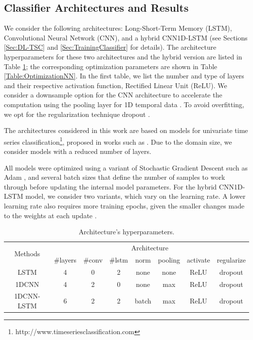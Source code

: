 \subsection{Classifier Architectures and Results}
\label{Sec:TSC_NN_Results}

We consider the following architectures: Long-Short-Term Memory (LSTM), Convolutional Neural Network (CNN), and a hybrid CNN1D-LSTM (see Sections \ref{Sec:DL-TSC} and \ref{Sec:TrainingClassifier} for details). The architecture hyperparameters for these two architectures and the hybrid version are listed in Table \ref{Table:HyperparametersNN}; the corresponding optimization parameters are shown in Table \ref{Table:OptimizationNN}. In the first table, we list the number and type of layers and their respective activation function, Rectified Linear Unit (ReLU). We consider a downsample option for the CNN architecture to accelerate the computation using the pooling layer for 1D temporal data \cite{Gholamalinezhad2020}. To avoid overfitting, we opt for the regularization technique dropout \cite{Srivastava2014, Baldi2013}. 

The architectures considered in this work are based on models for univariate time series classification\footnote{http://www.timeseriesclassification.com}, proposed in works such as \cite{Bagnall2017a, Fawaz2019}. Due to the domain size, we consider models with a reduced number of layers.

All models were optimized using a variant of Stochastic Gradient Descent such as Adam \cite{Kingma2015}, and several batch sizes that define the number of samples to work through before updating the internal model parameters. For the hybrid CNN1D-LSTM model, we consider two variants, which vary on the learning rate. A lower learning rate also requires more training epochs, given the smaller changes made to the weights at each update \cite{Patterson2017}.

\begin{table}[h]
	\centering
	\small
	\begin{tabular}{|c|c|c|c|c|c|c|c|}
		\hline
		\multirow{2}{*}{Methods} & \multicolumn{7}{c|}{Architecture} \\
		\cline{2-8}
		& \#layers & \#conv & \#lstm & norm & pooling & activate & regularize \\
		\cline{2-8}
		\hline
		LSTM & 4 & 0 & 2 & none & none & ReLU & dropout \\
		\hline
		1DCNN & 4 & 2 & 0 & none & max & ReLU & dropout \\
		\hline
		1DCNN-LSTM & 6 & 2 & 2 & batch & max & ReLU & dropout  \\
		\hline
	\end{tabular}
	\caption{Architecture’s hyperparameters.}
	\label{Table:HyperparametersNN}
\end{table}

